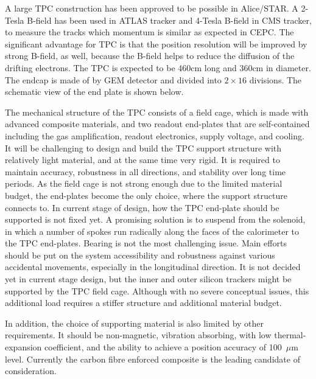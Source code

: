 A large TPC construction has been approved to be possible in Alice/STAR. A 2-Tesla B-field has been used in ATLAS tracker and 4-Tesla B-field in CMS tracker, to measure the tracks which momentum is similar as expected in CEPC. The significant advantage for TPC is that the position resolution will be improved by strong B-field, as well, because the B-field helps to reduce the diffusion of the drifting electrons. The TPC is expected to be 460cm long and 360cm in diameter. The endcap is made of by GEM detector and divided into $2\!\times\!16$ divisions.  The schematic view of the end plate is shown below.

The mechanical structure of the TPC consists of a field cage, which is made with advanced composite materials, and two readout end-plates that are self-contained including the gas amplification, readout electronics, supply voltage, and cooling. It will be challenging to design and build the TPC support structure with relatively light material, and at the same time very rigid. It is required to maintain accuracy, robustness in all directions, and stability over long time periods. As the field cage is not strong enough due to the limited material budget, the end-plates become the only choice, where the support structure connects to. In current stage of design, how the TPC end-plate should be supported is not fixed yet. A promising solution is to suspend from the solenoid, in which a number of spokes run radically along the faces of the calorimeter to the TPC end-plates. Bearing is not the most challenging issue. Main efforts should be put on the system accessibility and robustness against various accidental movements, especially in the longitudinal direction. It is not decided yet in current stage design, but the inner and outer silicon trackers might be supported by the TPC field cage. Although with no severe conceptual issues, this additional load requires a stiffer structure and additional material budget.

In addition, the choice of supporting material is also limited by other requirements. It should be non-magnetic, vibration absorbing, with low thermal-expansion coefficient, and the ability to achieve a position accuracy of 100~$\mu$m level. Currently the carbon fibre enforced composite is the leading candidate of consideration.

